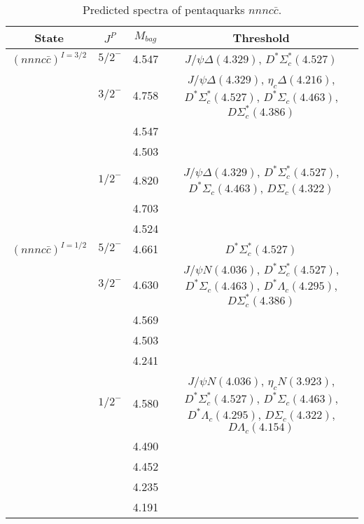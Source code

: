 \documentclass[prd,twocolumn,floatfix,nofootinbib]{revtex4}
\begin{document}
\renewcommand{\tabcolsep}{0.2cm}
\renewcommand{\arraystretch}{1.2}
\begin{table*}[!htbp]
    \caption{Predicted spectra of pentaquarks $nnnc\bar{c}$.}
    \begin{tabular}{cccc}
        \hline\hline
        {\rm State} &$J^{P}$ &$M_{bag}$ &Threshold \\ \hline
        ${(nnnc\bar{c})}^{I=3/2}$
            &${5/2}^{-}$    &4.547 &$J/\psi\Delta(4.329)$, $D^{\ast}\Sigma_{c}^{\ast}(4.527)$ \\
            &${3/2}^{-}$    &4.758 &$J/\psi\Delta(4.329)$, $\eta_{c}\Delta(4.216)$, $D^{\ast}\Sigma_{c}^{\ast}(4.527)$, $D^{\ast}\Sigma_{c}(4.463)$, $D\Sigma_{c}^{\ast}(4.386)$ \\
            &               &4.547 & \\
            &               &4.503 & \\
            &${1/2}^{-}$    &4.820 &$J/\psi\Delta(4.329)$, $D^{\ast}\Sigma_{c}^{\ast}(4.527)$, $D^{\ast}\Sigma_{c}(4.463)$, $D\Sigma_{c}(4.322)$ \\
            &               &4.703 & \\
            &               &4.524 & \\
        ${(nnnc\bar{c})}^{I=1/2}$
            &${5/2}^{-}$    &4.661 &$D^{\ast}\Sigma_{c}^{\ast}(4.527)$ \\
            &${3/2}^{-}$    &4.630 &$J/\psi N(4.036)$, $D^{\ast}\Sigma_{c}^{\ast}(4.527)$, $D^{\ast}\Sigma_{c}(4.463)$, $D^{\ast}\Lambda_{c}(4.295)$, $D\Sigma_{c}^{\ast}(4.386)$ \\
            &               &4.569 & \\
            &               &4.503 & \\
            &               &4.241 & \\
            &${1/2}^{-}$    &4.580 &$J/\psi N(4.036)$, $\eta_{c}N(3.923)$, $D^{\ast}\Sigma_{c}^{\ast}(4.527)$, $D^{\ast}\Sigma_{c}(4.463)$, $D^{\ast}\Lambda_{c}(4.295)$, $D\Sigma_{c}(4.322)$, $D\Lambda_{c}(4.154)$ \\
            &               &4.490 & \\
            &               &4.452 & \\
            &               &4.235 & \\
            &               &4.191 & \\
        \hline\hline
    \end{tabular}
\end{table*}
\end{document}
